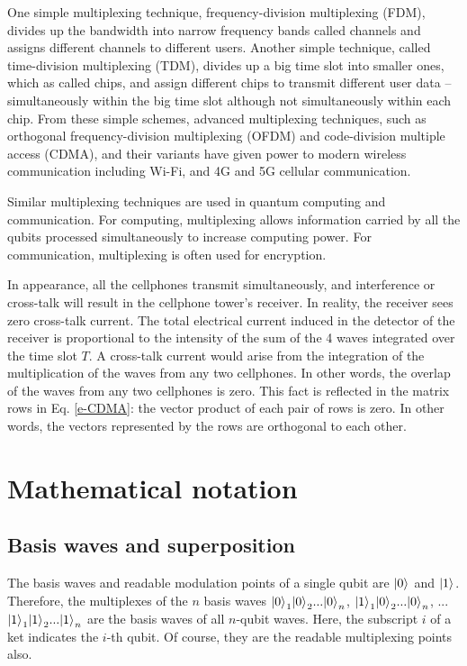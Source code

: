 \documentclass[oneside, letter, 12pt]{book}
\begin{document}
One simple multiplexing technique, frequency-division multiplexing (FDM), divides up the bandwidth into narrow frequency bands called channels and assigns different channels to different users. Another simple technique, called time-division multiplexing (TDM), divides up a big time slot into smaller ones, which as called chips, and assign different chips to transmit different user data -- simultaneously within the big time slot although not simultaneously within each chip. From these simple schemes, advanced multiplexing techniques, such as orthogonal frequency-division multiplexing (OFDM) and code-division multiple access (CDMA), and their variants have given power to modern wireless communication including Wi-Fi, and 4G and 5G cellular communication.

Similar multiplexing techniques are used in quantum computing and communication. For computing, multiplexing allows information carried by all the qubits processed simultaneously to increase computing power. For communication, multiplexing is often used for encryption.

In appearance, all the cellphones transmit simultaneously, and interference or cross-talk will result in the cellphone tower's receiver. In reality, the receiver sees zero cross-talk current. The total electrical current induced in the detector of the receiver is proportional to the intensity of the sum of the 4 waves integrated over the time slot $T$. A cross-talk current would arise from the integration of the multiplication of the waves from any two cellphones. In other words, the overlap of the waves from any two cellphones is zero. This fact is reflected in the matrix rows in Eq. \ref{e-CDMA}: the vector product of each pair of rows is zero. In other words, the vectors represented by the rows are orthogonal to each other. 

\section{Mathematical notation}

\subsection{Basis waves and superposition}
The basis waves and readable modulation points of a single qubit are $\vert {0} \rangle_{}$ and $\vert {1} \rangle_{}$. Therefore, the multiplexes of the $n$ basis waves ${\vert {0} \rangle_{}}_1 {\vert {0} \rangle_{}}_2 ... {\vert {0} \rangle_{}}_n$,  ${\vert {1} \rangle_{}}_1 {\vert {0} \rangle_{}}_2 ... {\vert {0} \rangle_{}}_n$, ... ${\vert {1} \rangle_{}}_1 {\vert {1} \rangle_{}}_2 ... {\vert {1} \rangle_{}}_n$ are the basis waves of all $n$-qubit waves. Here, the subscript $i$ of a ket indicates the $i$-th qubit. Of course, they are the readable multiplexing points also.
\end{document}
